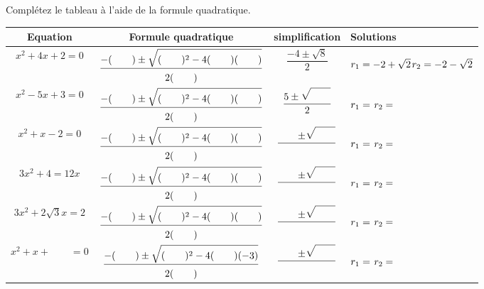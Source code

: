 \documentclass[main.tex]{subfiles}
\begin{document}
\begin{exercise} Complétez le tableau à l'aide de la formule quadratique.
	
\noindent
\begin{tabularx}{1\linewidth}{|c|c|c|X|} 
	\hline
	\textbf{Equation}& \textbf{Formule quadratique} & \textbf{simplification}& Solutions \\ \hline 
$x^2+4x+2=0$
	& $\dfrac{-(\rule{0pt}{1.4em}\qquad)\pm \sqrt{(\qquad\rule{0pt}{1.1em})^2-4(\qquad\rule{0pt}{1.1em})(\qquad)}}{2(\qquad\rule{0pt}{1.1em})}$
	& $\dfrac{-4\pm \sqrt{8}}{2}$
	& $r_1=-2 +\sqrt{2}\rule{0pt}{1.9em}$\newline $r_2=-2 -\sqrt{2}\rule{0pt}{1.6em}$ \\ \hline
$x^2-5x+3=0$
	& $\dfrac{-(\rule{0pt}{1.4em}\qquad)\pm \sqrt{(\qquad\rule{0pt}{1.1em})^2-4(\qquad\rule{0pt}{1.1em})(\qquad)}}{2(\qquad\rule{0pt}{1.1em})}$
	& $\dfrac{5\pm \sqrt{\qquad\rule{0pt}{1.1em} }}{2}$
	& $r_1=\rule{0pt}{2.0em} $\newline $r_2= \rule{0pt}{1.6em}$ \\ \hline
$x^2+x-2=0$
	& $\dfrac{-(\rule{0pt}{1.4em}\qquad)\pm \sqrt{(\qquad\rule{0pt}{1.1em})^2-4(\qquad\rule{0pt}{1.1em})(\qquad)}}{2(\qquad\rule{0pt}{1.1em})}$
	& $\dfrac{\qquad\pm \sqrt{\qquad\rule{0pt}{1.1em} }}{\qquad}$
	& $r_1=\rule{0pt}{2.0em} $\newline $r_2= \rule{0pt}{1.6em}$ \\ \hline
$3x^2+4=12x$
	& $\dfrac{-(\rule{0pt}{1.4em}\qquad)\pm \sqrt{(\qquad\rule{0pt}{1.1em})^2-4(\qquad\rule{0pt}{1.1em})(\qquad)}}{2(\qquad\rule{0pt}{1.1em})}$
	& $\dfrac{\qquad\pm \sqrt{\qquad\rule{0pt}{1.1em} }}{\qquad}$
	& $r_1=\rule{0pt}{2.0em} $\newline $r_2= \rule{0pt}{1.6em}$ \\ \hline
$3x^2+2\sqrt{3}x=2$
	& $\dfrac{-(\rule{0pt}{1.4em}\qquad)\pm \sqrt{(\qquad\rule{0pt}{1.1em})^2-4(\qquad\rule{0pt}{1.1em})(\qquad)}}{2(\qquad\rule{0pt}{1.1em})}$
	& $\dfrac{\qquad\pm \sqrt{\qquad\rule{0pt}{1.1em} }}{\qquad}$
	& $r_1=\rule{0pt}{2.0em} $\newline $r_2= \rule{0pt}{1.6em}$ \\ \hline
$x^2+x+\qquad = 0$
	& $\dfrac{-(\rule{0pt}{1.4em}\qquad)\pm \sqrt{(\qquad\rule{0pt}{1.1em})^2-4(\qquad\rule{0pt}{1.1em})(-3)}}{2(\qquad\rule{0pt}{1.1em})}$
	& $\dfrac{\qquad\pm \sqrt{\qquad\rule{0pt}{1.1em} }}{\qquad}$
	& $r_1=\rule{0pt}{2.0em} $\newline $r_2= \rule{0pt}{1.6em}$ \\ \hline

\end{tabularx}
\end{exercise}
\end{document}
